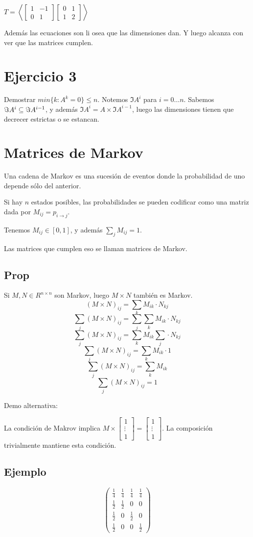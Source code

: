 \documentclass{article}
\begin{document}
	$T = \left\langle
		\begin{bmatrix}
			1 & -1 \\
			0 & 1
		\end{bmatrix}
		\begin{bmatrix}
			0 & 1 \\
			1 & 2
		\end{bmatrix}
	\right\rangle$

	Además las ecuaciones son li osea que las dimensiones dan. Y luego alcanza con ver que
	las matrices cumplen.

	\section{Ejercicio 3}
	Demostrar $min \{k : A^k = 0\} \leq n$.
	Notemos $\Im A^i$ para $i = 0\dots n$. Sabemos $\Im A^i \subseteq \Im A^{i-1}$, y además
	$\Im A^i = A \times \Im A^{i-1}$, luego las dimensiones tienen
	que decrecer estrictas o se estancan.

	\section{Matrices de Markov}
	Una cadena de Markov es una sucesión de eventos donde la probabilidad de uno depende
	sólo del anterior.

	Si hay $n$ estados posibles, las probabilidades se pueden codificar como una matriz
	dada por $M_{ij} = p_{i \to j}$.

	Tenemos $M_{ij} \in [0, 1]$, y además $\sum_j M_{ij} = 1$.

	Las matrices que cumplen eso se llaman matrices de Markov.

	\subsection{Prop}
	Si $M, N \in R^{n \times n}$ son Markov, luego $M \times N$ también es Markov.
	\[(M \times N)_{ij} = \sum_k M_{ik} \cdot N_{kj}\]
	\[\sum_j (M \times N)_{ij} = \sum_j \sum_k M_{ik} \cdot N_{kj}\]
	\[\sum_j (M \times N)_{ij} = \sum_k M_{ik} \sum_j \cdot N_{kj}\]
	\[\sum_j (M \times N)_{ij} = \sum_k M_{ik} \cdot 1\]
	\[\sum_j (M \times N)_{ij} = \sum_k M_{ik}\]
	\[\sum_j (M \times N)_{ij} = 1\]

	Demo alternativa:

	La condición de Makrov implica $M \times 
	\begin{bmatrix}
		1 \\
		\vdots \\
		1
	\end{bmatrix} =
	\begin{bmatrix}
		1 \\
		\vdots \\
		1
	\end{bmatrix}
	$. La composición trivialmente mantiene esta condición.

	\subsection{Ejemplo}
	\[
	\begin{pmatrix}
		\frac{1}{4} & \frac{1}{4} & \frac{1}{4} & \frac{1}{4} \\
		\frac{1}{2} & \frac{1}{2} & 0 & 0 \\
		\frac{1}{2} & 0 & \frac{1}{2} & 0 \\
		\frac{1}{2} & 0 & 0 & \frac{1}{2}
	\end{pmatrix}
	\]
\end{document}
